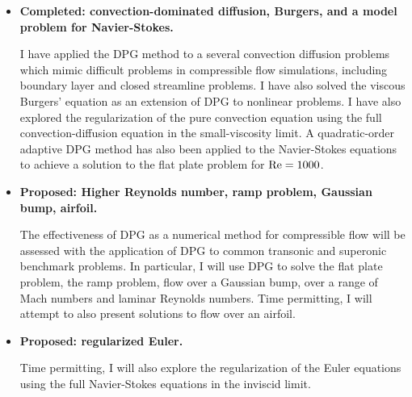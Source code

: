\begin{itemize}
\item{\textbf{Completed: convection-dominated diffusion, Burgers, and a model problem for Navier-Stokes.}} 

I have applied the DPG method to a several convection diffusion problems which mimic difficult problems in compressible flow simulations, including boundary layer and closed streamline problems.  I have also solved the viscous Burgers' equation as an extension of DPG to nonlinear problems. I have also explored the regularization of the pure convection equation using the full convection-diffusion equation in the small-viscosity limit. A quadratic-order adaptive DPG method has also been applied to the Navier-Stokes equations to achieve a solution to the flat plate problem for $\Reyn = 1000$.

\item{\textbf{Proposed: Higher Reynolds number, ramp problem, Gaussian bump, airfoil.}}

The effectiveness of DPG as a numerical method for compressible flow will be assessed with the application of DPG to common transonic and superonic benchmark problems.  In particular, I will use DPG to solve the flat plate problem, the ramp problem, flow over a Gaussian bump, over a range of Mach numbers and laminar Reynolds numbers. Time permitting, I will attempt to also present solutions to flow over an airfoil. 

\item{\textbf{Proposed: regularized Euler.}}

Time permitting, I will also explore the regularization of the Euler equations using the full Navier-Stokes equations in the inviscid limit.

\end{itemize}

